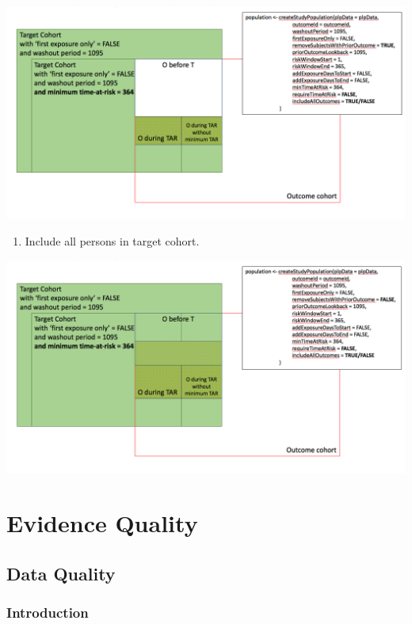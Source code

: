 \documentclass[]{book}
\providecommand{\tightlist}{%
  \setlength{\itemsep}{0pt}\setlength{\parskip}{0pt}}
\begin{document}
\includegraphics[width=1\linewidth]{images/PatientLevelPrediction/popdef5}

\begin{enumerate}
\def\labelenumi{\arabic{enumi}.}
\setcounter{enumi}{5}
\tightlist
\item
  Include all persons in target cohort.
\end{enumerate}

\includegraphics[width=1\linewidth]{images/PatientLevelPrediction/popdef6}

\part{Evidence Quality}\label{part-evidence-quality}

\chapter{Data Quality}\label{DataQuality}

\section{Introduction}\label{introduction}
\end{document}

